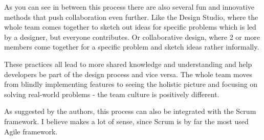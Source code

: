As you can see in between this process there are also several fun and innovative methods that push
collaboration even further. Like the Design Studio, where the whole team comes together to sketch
out ideas for specific problems which is led by a designer, but everyone contributes. 
 Or collaborative design, where 2 or more
members come together for a specific problem and sketch ideas rather informally. 

These practices all lead to more shared knowledge and understanding and help developers be part of
the design process and vice versa. The whole team moves from blindly implementing features to seeing
the holistic picture and focusing on solving real-world problems - the team culture is positively
different.

As suggested by the authors, this process can also be integrated with the Scrum framework. I believe
makes a lot of sense, since Scrum is by far the most used Agile framework.
